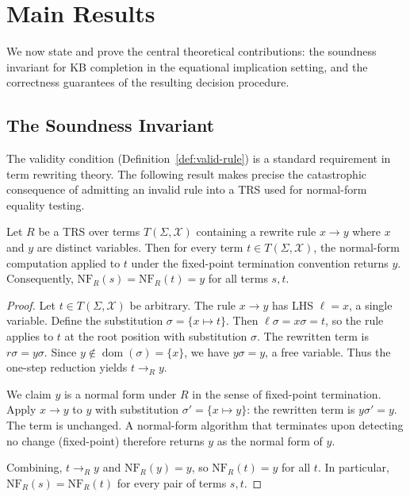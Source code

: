 \section{Main Results}
\label{sec:main}

We now state and prove the central theoretical contributions: the soundness invariant
for KB completion in the equational implication setting, and the correctness guarantees
of the resulting decision procedure.

\subsection{The Soundness Invariant}

The validity condition (Definition~\ref{def:valid-rule}) is a standard requirement in
term rewriting theory.  The following result makes precise the catastrophic consequence
of admitting an invalid rule into a TRS used for normal-form equality testing.

\begin{lemma}\label{thm:collapse}
Let $R$ be a TRS over terms $T(\Sigma, \mathcal{X})$ containing a rewrite rule
$x \to y$ where $x$ and $y$ are distinct variables.  Then for every term
$t \in T(\Sigma, \mathcal{X})$, the normal-form computation applied to $t$ under
the fixed-point termination convention returns $y$.  Consequently,
$\mathrm{NF}_R(s) = \mathrm{NF}_R(t) = y$ for all terms $s, t$.
\end{lemma}

\begin{proof}
Let $t \in T(\Sigma, \mathcal{X})$ be arbitrary.  The rule $x \to y$ has LHS
$\ell = x$, a single variable.  Define the substitution $\sigma = \{x \mapsto t\}$.
Then $\ell\sigma = x\sigma = t$, so the rule applies to $t$ at the root position
with substitution $\sigma$.  The rewritten term is $r\sigma = y\sigma$.  Since
$y \notin \operatorname{dom}(\sigma) = \{x\}$, we have $y\sigma = y$, a free variable.
Thus the one-step reduction yields $t \to_R y$.

We claim $y$ is a normal form under $R$ in the sense of fixed-point termination.
Apply $x \to y$ to $y$ with substitution $\sigma' = \{x \mapsto y\}$: the rewritten
term is $y\sigma' = y$.  The term is unchanged.  A normal-form algorithm that
terminates upon detecting no change (fixed-point) therefore returns $y$ as the normal
form of $y$.

Combining, $t \to_R y$ and $\mathrm{NF}_R(y) = y$, so $\mathrm{NF}_R(t) = y$ for
all $t$.  In particular, $\mathrm{NF}_R(s) = \mathrm{NF}_R(t)$ for every pair of
terms $s, t$.
\end{proof}

